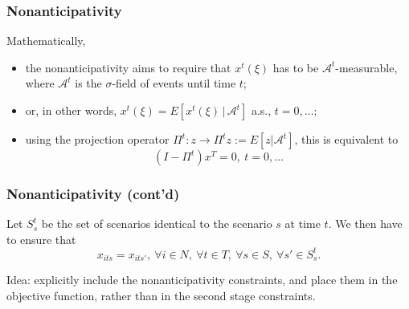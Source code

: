 \documentclass{beamer}
\begin{document}
\begin{frame}
\frametitle{Nonanticipativity}

\begin{minipage}{0.45\textwidth}
\begin{center}
\hspace*{1cm} 
\end{center}
\end{minipage}
\hfill
\begin{minipage}{0.45\textwidth}
\begin{center}
\end{center}
\end{minipage}

Mathematically,
\begin{itemize}
\item
the nonanticipativity aims to require that $x^t(\xi)$ has to be $\mathcal{A}^t$-measurable, where $\mathcal{A}^t$ is the $\sigma$-field of events until time $t$;
\item
or, in other words, $x^t(\xi) = E[x^t(\xi) \,|\, \mathcal{A}^t]$ a.s., $t = 0,\ldots$;
\item
using the projection operator $\Pi^t: z \rightarrow \Pi^t z := E[ z | \mathcal{A}^t]$, this is equivalent to
\[
(I-\Pi^t)x^T = 0,\ t = 0,\ldots
\]
\end{itemize}

\end{frame}

\begin{frame}
\frametitle{Nonanticipativity (cont'd)}

Let $S_s^t$ be the set of scenarios identical to the  scenario $s$ at time $t$.
We then have to ensure that
\[
x_{its} = x_{its'},\ \forall i \in N,\ \forall t \in T,\ \forall s \in
S,\ \forall s' \in S_s^t.
\]

\mbox{}

{\red Idea}: explicitly include the nonanticipativity constraints, and place them in the objective function, rather than in the second stage constraints.

\end{frame}
\end{document}
